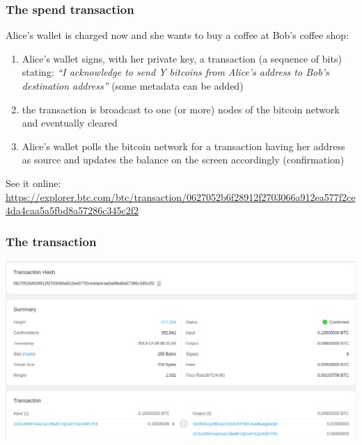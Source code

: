 \documentclass[11pt]{beamer}  %
\begin{document}
\begin{frame}\frametitle{The spend transaction}

  Alice's wallet is charged now and she wants to buy a coffee at Bob's coffee shop:

  \begin{enumerate}
  \item Alice's wallet signs, with her private key, a transaction
    (a sequence of bits) stating: \emph{``I acknowledge to send Y bitcoins from Alice's address
    to Bob's destination address''} (some metadata can be added)
  \item the transaction is broadcast to one (or more) nodes of the
    bitcoin network and eventually cleared
  \item Alice's wallet polls the bitcoin network for a transaction having
    her address as source and updates the balance on the screen
    accordingly (\alert{confirmation})
  \end{enumerate}

  \medskip
  See it online:
  {\scriptsize\url{https://explorer.btc.com/btc/transaction/0627052b6f28912f2703066a912ea577f2ce4da4caa5a5fbd8a57286c345c2f2}}

\end{frame}

\begin{frame}\frametitle{The transaction}

  \begin{center}
    \includegraphics[scale=0.21,clip=false]{pictures/bitcoin-spend.png}
  \end{center}

\end{frame}
\end{document}
